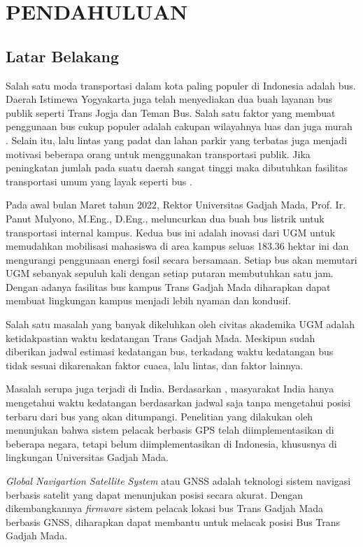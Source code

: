 \chapter{PENDAHULUAN}

\section{Latar Belakang}
Salah satu moda transportasi dalam kota paling populer di Indonesia adalah bus. Daerah Istimewa Yogyakarta juga telah menyediakan dua buah layanan bus publik seperti Trans Jogja dan Teman Bus. Salah satu faktor yang membuat penggunaan bus cukup populer adalah cakupan wilayahnya luas dan juga murah \cite{Rohani2013}. Selain itu, lalu lintas yang padat dan lahan parkir yang terbatas juga menjadi motivasi beberapa orang untuk menggunakan transportasi publik. Jika peningkatan jumlah pada suatu daerah sangat tinggi maka dibutuhkan fasilitas transportasi umum yang layak seperti bus \cite{Sutandi2015}.

Pada awal bulan Maret tahun 2022, Rektor Universitas Gadjah Mada, Prof. Ir. Panut Mulyono, M.Eng., D.Eng., meluncurkan dua buah bus listrik untuk transportasi internal kampus. Kedua bus ini adalah inovasi dari UGM untuk memudahkan mobilisasi mahasiswa di area kampus seluas 183.36 hektar ini dan mengurangi penggunaan energi fosil secara bersamaan. Setiap bus akan memutari UGM sebanyak sepuluh kali dengan setiap putaran membutuhkan satu jam. Dengan adanya fasilitas bus kampus Trans Gadjah Mada diharapkan dapat membuat lingkungan kampus menjadi lebih nyaman dan kondusif.

Salah satu masalah yang banyak dikeluhkan oleh civitas akademika UGM adalah ketidakpastian waktu kedatangan Trans Gadjah Mada. Meskipun sudah diberikan jadwal estimasi kedatangan bus, terkadang waktu kedatangan bus tidak sesuai dikarenakan faktor cuaca, lalu lintas, dan faktor lainnya.

Masalah serupa juga terjadi di India. Berdasarkan  \cite{Sutar2016}, masyarakat India hanya mengetahui waktu kedatangan berdasarkan jadwal saja tanpa mengetahui posisi terbaru dari bus yang akan ditumpangi. Penelitian yang dilakukan oleh \cite{Sneha2014} menunjukan bahwa sistem pelacak berbasis GPS telah diimplementasikan di beberapa negara, tetapi belum diimplementasikan di Indonesia, khususnya di lingkungan Universitas Gadjah Mada.

\textit{Global Navigartion Satellite System} atau GNSS adalah teknologi sistem navigasi berbasis satelit yang dapat menunjukan posisi secara akurat. Dengan dikembangkannya \textit{firmware} sistem pelacak lokasi bus Trans Gadjah Mada berbasis GNSS, diharapkan dapat membantu untuk melacak posisi Bus Trans Gadjah Mada.

